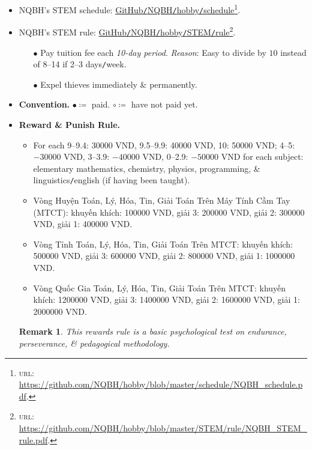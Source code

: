 \documentclass{article}
\newtheorem{remark}{Remark}
\begin{document}
\begin{itemize}
	\item NQBH's STEM schedule: \href{https://github.com/NQBH/hobby/blob/master/schedule/NQBH_schedule.pdf}{GitHub\texttt{/}NQBH\texttt{/}hobby\texttt{/}schedule}\footnote{\textsc{url}: \url{https://github.com/NQBH/hobby/blob/master/schedule/NQBH_schedule.pdf}.}.
	\item NQBH's STEM rule: \href{https://github.com/NQBH/hobby/blob/master/STEM/rule/NQBH_STEM_rule.pdf}{GitHub\texttt{/}NQBH\texttt{/}hobby\texttt{/}STEM\texttt{/}rule}\footnote{\textsc{url}: \url{https://github.com/NQBH/hobby/blob/master/STEM/rule/NQBH_STEM_rule.pdf}.}.
	\begin{itemize}
		\item[$\bullet$] Pay tuition fee each \textit{10-day period}. \textit{Reason}: Easy to divide by $10$ instead of 8--14 if 2--3 days\texttt{/}week.
		\item[$\bullet$] Expel thieves immediately \& permanently.
	\end{itemize}
	\item \textbf{Convention.} $\bullet\coloneq$ paid. $\circ\coloneq$ have not paid yet.
	\item \textbf{Reward \& Punish Rule.}
	\begin{itemize}
		\item For each 9--9.4: 30000 VND, 9.5--9.9: 40000 VND, 10: 50000 VND; 4--5: $-30000$ VND, 3--3.9: $-40000$ VND, 0--2.9: $-50000$ VND for each subject: elementary mathematics, chemistry, physics, programming, \& linguistics\texttt{/}english (if having been taught).
		\item Vòng Huyện Toán, Lý, Hóa, Tin, Giải Toán Trên Máy Tính Cầm Tay (MTCT): khuyến khích: 100000 VND, giải 3: 200000 VND, giải 2: 300000 VND, giải 1: 400000 VND.
		\item Vòng Tỉnh Toán, Lý, Hóa, Tin, Giải Toán Trên MTCT: khuyến khích: 500000 VND, giải 3: 600000 VND, giải 2: 800000 VND, giải 1: 1000000 VND.
		\item Vòng Quốc Gia Toán, Lý, Hóa, Tin, Giải Toán Trên MTCT: khuyến khích: 1200000 VND, giải 3: 1400000 VND, giải 2: 1600000 VND, giải 1: 2000000 VND.
	\end{itemize}
		 
	\begin{remark}
		This rewards rule is a basic psychological test on endurance, perseverance, \& pedagogical methodology.
	\end{remark}
\end{itemize}
\end{document}
